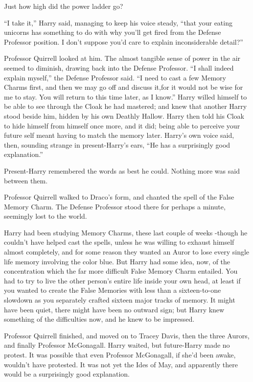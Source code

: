 Just how high did the power ladder go?

``I take it,'' Harry said, managing to keep his voice steady, ``that your eating unicorns has something to do with why you'll get fired from the Defense Professor position. I don't suppose you'd care to explain inconsiderable detail?''

Professor Quirrell looked at him. The almost tangible sense of power in the air seemed to diminish, drawing back into the Defense Professor. ``I shall indeed explain myself,'' the Defense Professor said. ``I need to cast a few Memory Charms first, and then we may go off and discuss it,for it would not be wise for me to stay. You will return to this time later, as I know.''
Harry willed himself to be able to see through the Cloak he had mastered; and knew that another Harry stood beside him, hidden by his own Deathly Hallow. Harry then told his Cloak to hide himself from himself once more, and it did; being able to perceive your future self meant having to match the memory later.
Harry's own voice said, then, sounding strange in present-Harry's ears, ``He has a surprisingly good explanation.''

Present-Harry remembered the words as best he could. Nothing more was said between them.

Professor Quirrell walked to Draco's form, and chanted the spell of the False Memory Charm. The Defense Professor stood there for perhaps a minute, seemingly lost to the world.

Harry had been studying Memory Charms, these last couple of weeks -though he couldn't have helped cast the spells, unless he was willing to exhaust himself almost completely, and for some reason they wanted an Auror to lose every single life memory involving the color blue. But Harry had some idea, now, of the concentration which the far more difficult False Memory Charm entailed. You had to try to live the other person's entire life inside your own head, at least if you wanted to create the False Memories with less than a sixteen-to-one slowdown as you separately crafted sixteen major tracks of memory. It might have been quiet, there might have been no outward sign; but Harry knew something of the difficulties now, and he knew to be impressed.

Professor Quirrell finished, and moved on to Tracey Davis, then the three Aurors, and finally Professor McGonagall. Harry waited, but future-Harry made no protest. It was possible that even Professor McGonagall, if she'd been awake, wouldn't have protested. It was not yet the Ides of May, and apparently there would be a surprisingly good explanation.

